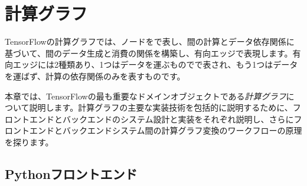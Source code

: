 \begin{savequote}[45mm]
\end{savequote}

\chapter{計算グラフ} 
\label{ch:computation-graph}

\begin{content}

TensorFlowの計算グラフでは、ノードをで表し、間の計算とデータ依存関係に基づいて、間のデータ生成と消費の関係を構築し、有向エッジで表現します。有向エッジには2種類あり、1つはデータを運ぶものでで表され、もう1つはデータを運ばず、計算の依存関係のみを表すものです。

本章では、TensorFlowの最も重要なドメインオブジェクトである\emph{計算グラフ}について説明します。計算グラフの主要な実装技術を包括的に説明するために、フロントエンドとバックエンドのシステム設計と実装をそれぞれ説明し、さらにフロントエンドとバックエンドシステム間の計算グラフ変換のワークフローの原理を探ります。

\end{content}

\section{Pythonフロントエンド}

